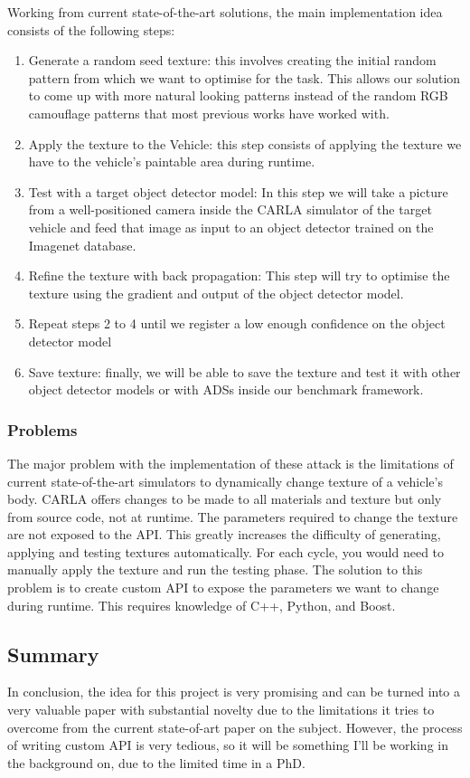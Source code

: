\documentclass[a4paper]{article}
\begin{document}
\noindent Working from current state-of-the-art solutions, the main implementation idea consists of the following steps:
\begin{enumerate}
  \item Generate a random seed texture: this involves creating the initial random pattern from which we want to optimise for the task. This allows our solution to come up with more natural looking patterns instead of the random RGB camouflage patterns that most previous works have worked with. 
  \item Apply the texture to the Vehicle: this step consists of applying the texture we have to the vehicle's paintable area during runtime.
  \item Test with a target object detector model: In this step we will take a picture from a well-positioned camera inside the CARLA simulator of the target vehicle and feed that image as input to an object detector trained on the Imagenet database.
  \item Refine the texture with back propagation: This step will try to optimise the texture using the gradient and output of the object detector model.
  \item Repeat steps 2 to 4 until we register a low enough confidence on the object detector model
  \item Save texture: finally, we will be able to save the texture and test it with other object detector models or with ADSs inside our benchmark framework.
\end{enumerate}
\subsubsection{Problems}
The major problem with the implementation of these attack is the limitations of current state-of-the-art simulators to dynamically change texture of a vehicle's body. CARLA offers changes to be made to all materials and texture but only from source code, not at runtime. The parameters required to change the texture are not exposed to the API. This greatly increases the difficulty of generating, applying and testing textures automatically. For each cycle, you would need to manually apply the texture and run the testing phase. The solution to this problem is to create custom API to expose the parameters we want to change during runtime. This requires knowledge of C++, Python, and Boost. 
\subsection{Summary}
In conclusion, the idea for this project is very promising and can be turned into a very valuable paper with substantial novelty due to the limitations it tries to overcome from the current state-of-art paper on the subject. However, the process of writing custom API is very tedious, so it will be something I'll be working in the background on, due to the limited time in a PhD.
\end{document}
